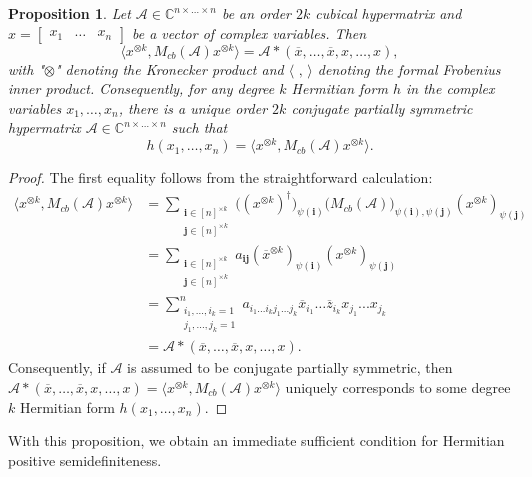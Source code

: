 \documentclass[11pt]{article}
\newtheorem{proposition}[theorem]{Proposition}
\begin{document}
\begin{proposition}\label{Matricized Hermitian Form}
    Let $\mathcal{A}\in \mathbb{C}^{n\times\dots\times n}$ be an order $2k$ cubical hypermatrix and $x = \left[\begin{array}{ccc}
        x_1 & \dots & x_n
    \end{array}\right]$ be a vector of complex variables. Then  
    \[\langle x^{\otimes k},M_{cb}(\mathcal{A})x^{\otimes k}\rangle = \mathcal{A}*(\overline{x},\dots,\overline{x},x,\dots,x),\]
    with "$\otimes$" denoting the Kronecker product and $\langle\text{ , }\rangle$ denoting the formal Frobenius inner product. Consequently, for any degree $k$ Hermitian form $h$ in the complex variables $x_1,\dots,x_n$, there is a unique order $2k$ conjugate partially symmetric hypermatrix $\mathcal{A}\in \mathbb{C}^{n\times\dots\times n}$ such that 
    \[h(x_1,\dots,x_n) = \langle x^{\otimes k},M_{cb}(\mathcal{A})x^{\otimes k}\rangle.\]
\end{proposition}
\begin{proof}
The first equality follows from the straightforward calculation:
\begin{align*}
    \langle x^{\otimes k},M_{cb}(\mathcal{A})x^{\otimes k}\rangle &= \sum\limits_{\substack{\mathbf{i}\in [n]^{\times k} \\
        \mathbf{j}\in [n]^{\times k}}}\big((x^{\otimes k})^{\dagger}\big)_{\psi(\mathbf{i})}\big(M_{cb}(\mathcal{A})\big)_{\psi(\mathbf{i}),\psi(\mathbf{j})}(x^{\otimes k})_{\psi(\mathbf{j})} \\
    &= \sum\limits_{\substack{\mathbf{i}\in [n]^{\times k} \\ \mathbf{j}\in [n]^{\times k}}}a_{\mathbf{i}\mathbf{j}}(\overline{x}^{\otimes k})_{\psi(\mathbf{i})}(x^{\otimes k})_{\psi(\mathbf{j})} \\
    &= \sum\limits_{\substack{i_1,...,i_k=1 \\ j_1,...,j_k=1}}^na_{i_1...i_kj_1...j_k}\overline{x}_{i_1}\dots\overline{z}_{i_k}x_{j_1}...x_{j_k} \\
    &= \mathcal{A}*(\overline{x},\dots,\overline{x},x,\dots,x).
\end{align*}
Consequently, if $\mathcal{A}$ is assumed to be conjugate partially symmetric, then $\mathcal{A}*(\overline{x},\dots,\overline{x},x,\dots,x) = \langle x^{\otimes k},M_{cb}(\mathcal{A})x^{\otimes k}\rangle$ uniquely corresponds to some degree $k$ Hermitian form $h(x_1,\dots,x_n)$. 
\end{proof}
With this proposition, we obtain an immediate sufficient condition for Hermitian positive semidefiniteness. 
\end{document}

